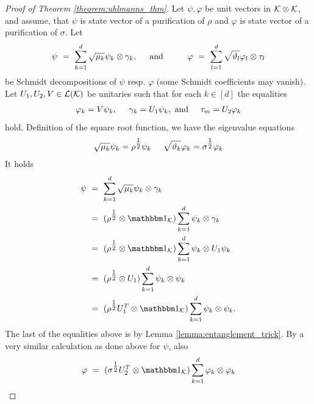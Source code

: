    \begin{proof}[Proof of Theorem \ref{theorem:uhlmanns_thm}]
  Let $\psi, \varphi$ be unit vectors in ${\mathcal K} \otimes {\mathcal K}$, and assume, that $\psi$ is state vector of a purification of $\rho$ and $\varphi$ is state vector of a purification of $\sigma$. Let 
  \begin{align*}
   \psi \ = \ \sum_{k=1}^d \sqrt{\mu_k} \psi_k \otimes \gamma_k, \hspace{.5cm} \text{and} \hspace{1cm}
   \varphi \ = \ \sum_{l=1}^d \sqrt{\vartheta_l} \varphi_l \otimes \tau_l 
  \end{align*}
   be Schmidt decompositions of $\psi$ resp. $\varphi$ (some Schmidt coefficients may vanish). Let $U_1, U_2, V \in {\mathcal L}({\mathcal K})$ be unitaries such that for each $k \in [d]$ the equalities
   \begin{align*}
    \varphi_k = V \psi_k, \hspace{.5cm} 
    \gamma_k  = U_1 \psi_k, \ \text{and} \hspace{.5cm}
    \tau_m = U_2 \varphi_k
   \end{align*}
   hold. Definition of the square root function, we have the eigenvalue equations 
   \begin{align}
    \sqrt{\mu_k} \psi_k = \rho^{\tfrac{1}{2}} \psi_k  \hspace{.5cm}
    \sqrt{\vartheta_k} \varphi_k = \sigma^{\tfrac{1}{2}} \varphi_k
   \end{align}
    It holds
   \begin{align}
    \psi 
    &\ = \ \sum_{k=1}^d \sqrt{\mu_k} \psi_k \otimes \gamma_k \nonumber \\
    &\ = \ (\rho^{\tfrac{1}{2}} \otimes \bbmeins_\cK)\sum_{k=1}^d \psi_k \otimes \gamma_k \nonumber \\
    &\ = \ (\rho^{\tfrac{1}{2}} \otimes \bbmeins_\cK)\sum_{k=1}^d \psi_k \otimes U_1\psi_k \nonumber \\
    &\ = \ (\rho^{\tfrac{1}{2}} \otimes U_1)\sum_{k=1}^d \psi_k \otimes \psi_k \nonumber \\
    &\ = \ (\rho^{\tfrac{1}{2}}U_1^T \otimes \bbmeins_\cK)\sum_{k=1}^d \psi_k \otimes \psi_k. \label{proof_uhlmanns_thm_1}
   \end{align}
    The last of the equalities above is by Lemma \ref{lemma:entanglement_trick}. By a very similar calculation as done above for $\psi$, also
    \begin{align*}
     \varphi \ = \ (\sigma^{\tfrac{1}{2}}U_2^T \otimes \bbmeins_\cK)\sum_{k=1}^d \varphi_k \otimes \varphi_k

\end{align*}
\end{proof}
